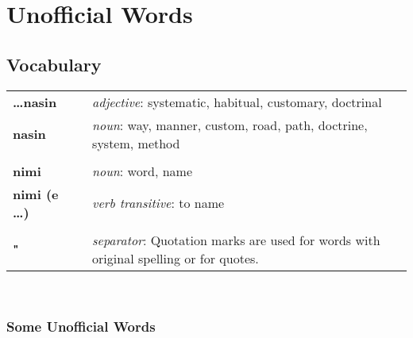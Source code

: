 \section{Unofficial Words}
%
\subsection*{Vocabulary}
%
\begin{supertabular}{p{2,5cm}|ll}
    \textbf{\dots nasin}     &  & \textit{adjective}: systematic, habitual, customary, doctrinal                               \\ %
    \textbf{nasin}           &  & \textit{noun}: way, manner, custom, road, path, doctrine, system, method                     \\ %
                             &  &                                                                                              \\ %
    \textbf{nimi}            &  & \textit{noun}: word, name                                                                    \\ %
    \textbf{nimi (e \dots )} &  & \textit{verb transitive}: to name                                                            \\ %
                             &  &                                                                                              \\ %
    \textbf{"}               &  & \textit{separator}: Quotation marks are used for words with original spelling or for quotes. \\ %
\end{supertabular} \\

\subsubsection*{Some Unofficial Words}

